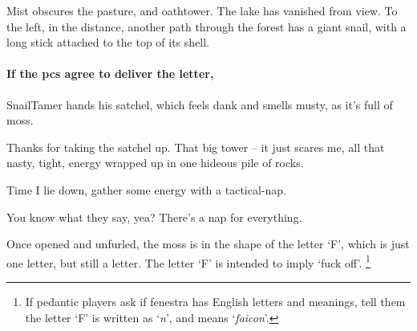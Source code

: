\begin{boxtext}
  Mist obscures the pasture, and \gls{oathtower}.
  The lake has vanished from view.
  To the left, in the distance, another path through the forest has a giant snail, with a long stick attached to the top of its shell.
\end{boxtext}

\paragraph{If the \glspl{pc} agree to deliver the letter,}
\gls{SnailTamer} hands his satchel, which feels dank and smells musty, as it's full of moss.

\begin{speechtext}
  Thanks for taking the satchel up.
  That big tower -- it just scares me, all that nasty, tight, energy wrapped up in one hideous pile of rocks.

  Time I lie down, gather some energy with a tactical-nap.

  You know what they say, yea?
  There's a nap for everything.
\end{speechtext}

Once opened and unfurled, the moss is in the shape of the letter `F', which is just one letter, but still a letter.
The letter `F' is intended to imply `fuck off'.%
\footnote{If pedantic players ask if \gls{fenestra} has English letters and meanings, tell them the letter `F' is written as `\emph{n}', and means `\textit{faicon}'.}


